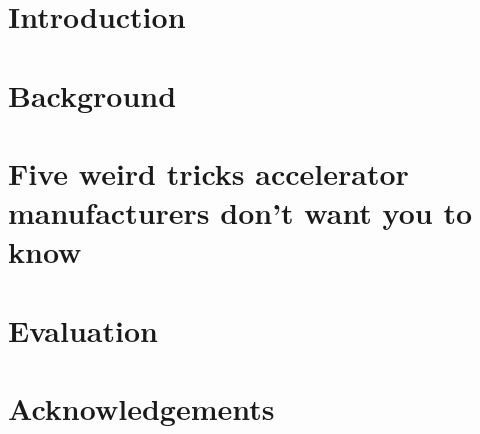 \documentclass[sigconf,techreport]{acmart}
\begin{document}





\maketitle

\tableofcontents

\section{Introduction}\label{sec:introduction}


\section{Background}\label{sec:background}


\section{Five weird tricks accelerator manufacturers don't want you to know}\label{sec:methodology}


\section{Evaluation}\label{sec:evaluation}


\section{Acknowledgements}



\end{document}
